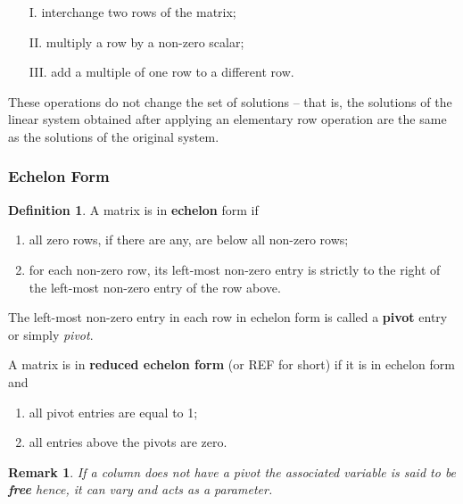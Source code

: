 \documentclass[12pt, a4paper]{article}
\newtheorem*{remark}{Remark}
\theoremstyle{definition}
\newtheorem{definition}{Definition}[section]
\theoremstyle{plain}
\begin{document}
\begin{enumerate}

\item[I.] interchange two rows of the matrix; 
\item[II.] multiply a row by a non-zero scalar;
\item[III.] add a multiple of one row to a different row.

\end{enumerate}

These operations do not change the set of solutions -- that is, the solutions of the linear system obtained after applying an elementary row operation are the same as the solutions of the original system.

\subsubsection{Echelon Form}

\begin{definition} A matrix is in \textbf{echelon} form if
\begin{enumerate}

	\item all zero rows, if there are any, are below all non-zero rows;
	\item for each non-zero row, its left-most non-zero entry is strictly to the right of the left-most non-zero entry of the row above.

\end{enumerate}

The left-most non-zero entry in each row in echelon form is called a \textbf{pivot} entry or simply \textit{pivot}.

A matrix is in \textbf{reduced echelon form} (or REF for short) if it is in echelon form and 

\begin{enumerate}

\item all pivot entries are equal to 1;
\item all entries above the pivots are zero.

\end{enumerate}

\end{definition}

\begin{remark}
If a column does not have a pivot the associated variable is said to be \textbf{free} hence, it can vary and acts as a parameter.
\end{remark}
\end{document}
